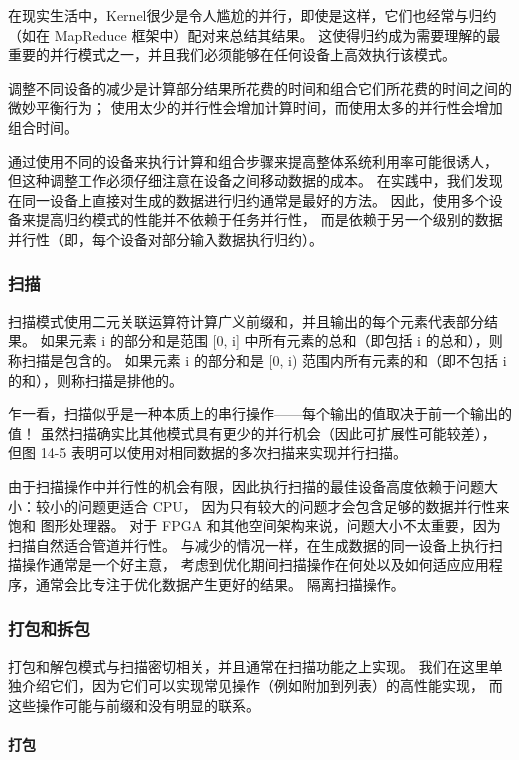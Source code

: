 在现实生活中，Kernel很少是令人尴尬的并行，即使是这样，它们也经常与归约（如在 MapReduce 框架中）配对来总结其结果。 
这使得归约成为需要理解的最重要的并行模式之一，并且我们必须能够在任何设备上高效执行该模式。

调整不同设备的减少是计算部分结果所花费的时间和组合它们所花费的时间之间的微妙平衡行为； 
使用太少的并行性会增加计算时间，而使用太多的并行性会增加组合时间。

通过使用不同的设备来执行计算和组合步骤来提高整体系统利用率可能很诱人，
但这种调整工作必须仔细注意在设备之间移动数据的成本。 
在实践中，我们发现在同一设备上直接对生成的数据进行归约通常是最好的方法。 
因此，使用多个设备来提高归约模式的性能并不依赖于任务并行性，
而是依赖于另一个级别的数据并行性（即，每个设备对部分输入数据执行归约）。

\subsubsection{扫描}
扫描模式使用二元关联运算符计算广义前缀和，并且输出的每个元素代表部分结果。 
如果元素 i 的部分和是范围 [0, i] 中所有元素的总和（即包括 i 的总和），则称扫描是包含的。 
如果元素 i 的部分和是 [0, i) 范围内所有元素的和（即不包括 i 的和），则称扫描是排他的。

乍一看，扫描似乎是一种本质上的串行操作——每个输出的值取决于前一个输出的值！ 
虽然扫描确实比其他模式具有更少的并行机会（因此可扩展性可能较差），
但图 14-5 表明可以使用对相同数据的多次扫描来实现并行扫描。

由于扫描操作中并行性的机会有限，因此执行扫描的最佳设备高度依赖于问题大小：较小的问题更适合 CPU，
因为只有较大的问题才会包含足够的数据并行性来饱和 图形处理器。 
对于 FPGA 和其他空间架构来说，问题大小不太重要，因为扫描自然适合管道并行性。 
与减少的情况一样，在生成数据的同一设备上执行扫描操作通常是一个好主意，
考虑到优化期间扫描操作在何处以及如何适应应用程序，通常会比专注于优化数据产生更好的结果。 隔离扫描操作。

\subsubsection{打包和拆包}
打包和解包模式与扫描密切相关，并且通常在扫描功能之上实现。 
我们在这里单独介绍它们，因为它们可以实现常见操作（例如附加到列表）的高性能实现，
而这些操作可能与前缀和没有明显的联系。

\paragraph{打包}

